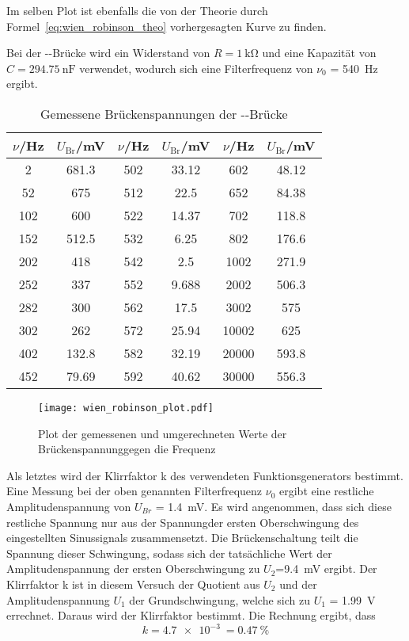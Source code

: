 Im selben Plot ist ebenfalls die von der Theorie durch
Formel~\eqref{eq:wien_robinson_theo} vorhergesagten Kurve zu finden.

Bei der --Brücke wird ein Widerstand von
$R=\SI{1}{\kilo\ohm}$ und eine Kapazität von
$C=\SI{294.75}{\nano\farad}$
verwendet, wodurch sich eine Filterfrequenz von $\nu_0$ =
\SI{540}{\hertz} ergibt.
%
\begin{table}[]
  \centering
  \begin{tabular}{SS|SS|SS}
     \toprule
{$\nu$/}\si{\hertz}&{$U_\text{Br}$/}\si{\milli\volt}&{$\nu$/}\si{\hertz}&
{$U_\text{Br}$/}\si{\milli\volt}&{$\nu$/}\si{\hertz}&
{$U_\text{Br}$/}\si{\milli\volt}\\
&681.3&502&33.12&602&48.12\\
52&675&512&22.5&652&84.38\\
102	&600&522	&14.37&702&118.8\\
152&512.5&532&6.25&802&176.6\\
202&418&542&2.5&1002&271.9\\
252&337&552&9.688&2002&506.3\\
282&300&562&17.5&3002&575\\
302&262&572&25.94&10002&625\\
402	&132.8&582&32.19&20000&593.8\\
452&79.69&592&40.62&30000&556.3\\
    \bottomrule
  \end{tabular}
\caption{Gemessene Brückenspannungen der
--Brücke}
  \label{tab:wien_robinson}
\end{table}
%
\begin{figure}
\centering
\texttt{[image: wien\_robinson\_plot.pdf]}
\caption{Plot der gemessenen und umgerechneten Werte der
Brückenspannunggegen die Frequenz}
\label{fig:wien_robinson_plot}
\end{figure}
%
Als letztes wird der Klirrfaktor k des verwendeten Funktionsgenerators
bestimmt.
Eine Messung bei der oben genannten Filterfrequenz $\nu_0$ ergibt eine
restliche Amplitudenspannung von $U_{Br}$ = \SI{1.4}{\milli\volt}. Es
wird angenommen, dass sich diese restliche Spannung nur aus der
Spannungder ersten Oberschwingung des eingestellten Sinussignals
zusammensetzt.
Die Brückenschaltung teilt die Spannung dieser Schwingung, sodass sich
der tatsächliche Wert der Amplitudenspannung der ersten Oberschwingung
zu $U_2$=\SI{9.4}{\milli\volt} ergibt.
Der Klirrfaktor k ist in diesem Versuch der Quotient aus $U_2$ und der
Amplitudenspannung $U_1$ der Grundschwingung, welche sich zu $U_1$ =
\SI{1.99}{\volt} errechnet.
Daraus wird der Klirrfaktor bestimmt. Die Rechnung ergibt, dass
%
\begin{equation*}
k = \SI{4.7e-3}{} = \SI{0.47}{\percent}
\end{equation*}
%
\FloatBarrier
